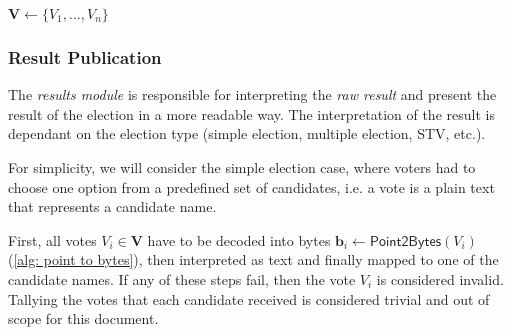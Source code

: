 \begin{algorithm}[ht]
\DontPrintSemicolon
    \caption{$\mathsf{FinalizeDecryption} (\boldsymbol{e}, \boldsymbol{S}_1, ..., \boldsymbol{S}_{n_\mathrm{d}})$}
    
    $\boldsymbol{V} \gets \{ V_1, ..., V_n \}$ \;
    
     
    
    \label{alg: finalize decryption}
\end{algorithm}


\subsubsection{Result Publication} \label{sec: result publication}
The \textit{results module} is responsible for interpreting the \textit{raw result} and present the result of the election in a more readable way. The interpretation of the result is dependant on the election type (simple election, multiple election, STV, etc.).

For simplicity, we will consider the simple election case, where voters had to choose one option from a predefined set of candidates, i.e. a vote is a plain text that represents a candidate name.

First, all votes $V_i \in \boldsymbol{V}$ have to be decoded into bytes $\boldsymbol{b}_i \gets \mathsf{Point2Bytes}(V_i)$ (\cref{alg: point to bytes}), then interpreted as text and finally mapped to one of the candidate names. If any of these steps fail, then the vote $V_i$ is considered invalid. Tallying the votes that each candidate received is considered trivial and out of scope for this document.

